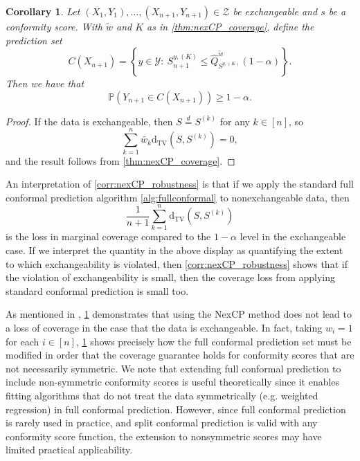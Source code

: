 \documentclass[11pt, titlepage]{article} %
\newcommand{\R}{\mathrm}
\newcommand{\Prob}[1]{\mathbb{P}\left( #1 \right)}
\numberwithin{equation}{section}
\newtheorem{corollary}{Corollary}
\theoremstyle{definition}
\numberwithin{theorem}{section}
\numberwithin{lemma}{section}
\numberwithin{corollary}{section}
\numberwithin{proposition}{section}
\numberwithin{definition}{section}
\numberwithin{remark}{section}
\begin{document}
\begin{corollary}
    Let \((X_1, Y_1), \ldots, (X_{n+1}, Y_{n+1}) \in \mathcal{Z}\) be exchangeable and \(s\) be a conformity score. With \(\tilde{w}\) and \(K\) as in \cref{thm:nexCP_coverage}, define the prediction set \[C(X_{n+1}) = \left\{ y \in \mathcal{Y} : \ S_{n+1}^{y, (K)} \leq \hat{Q}_{S^{y, (K)}}^{\tilde{w}}(1-\alpha)  \right\}.\] Then we have that \[
        \Prob{Y_{n+1} \in C(X_{n+1})}  \geq 1-\alpha.
    \]
\label{corr:nexCP_exchangeable}
\end{corollary}
\begin{proof}
    If the data is exchangeable, then \(S \overset{d}{=} S^{(k)}\) for any \(k \in [n] \), so \[\sum_{k=1}^n \tilde{w_k} \R{d_{TV}}(S, S^{(k)}) = 0,\] and the result follows from \cref{thm:nexCP_coverage}.
\end{proof}

\noindent
An interpretation of \cref{corr:nexCP_robustness} is that if we apply the standard full conformal prediction algorithm \cref{alg:fullconformal} to nonexchangeable data, then \[\frac{1}{n+1} \sum_{k=1}^{n} \R{d_{TV}}(S, S^{(k)})\] is the loss in marginal coverage compared to the \(1-\alpha\) level in the exchangeable case. If we interpret the quantity in the above display as quantifying the extent to which exchangeability is violated, then \cref{corr:nexCP_robustness} shows that if the violation of exchangeability is small, then the coverage loss from applying standard conformal prediction is small too. \vskip5pt

\noindent
As mentioned in \cite{barber2023conformalbeyondexch}, \cref{corr:nexCP_exchangeable} demonstrates that using the NexCP method does not lead to a loss of coverage in the case that the data is exchangeable. In fact, taking \(w_i = 1\) for each \(i \in [n]\), \cref{corr:nexCP_exchangeable} shows precisely how the full conformal prediction set must be modified in order that the coverage guarantee holds for conformity scores that are not necessarily symmetric. We note that extending full conformal prediction to include non-symmetric conformity scores is useful theoretically since it enables fitting algorithms that do not treat the data symmetrically (e.g. weighted regression) in full conformal prediction. However, since full conformal prediction is rarely used in practice, and split conformal prediction is valid with any conformity score function, the extension to nonsymmetric scores may have limited practical applicability. \vskip5pt
\end{document}
